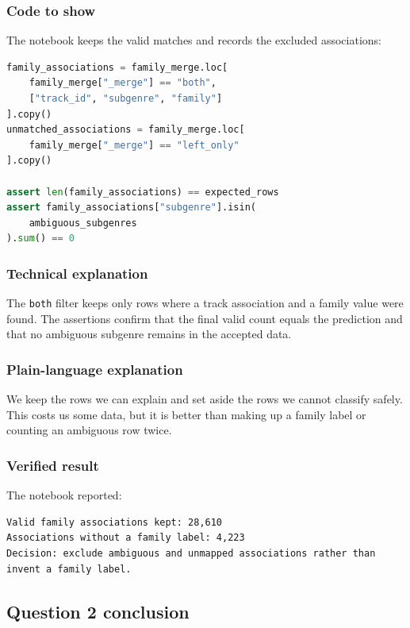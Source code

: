 \documentclass[11pt,a4paper]{article}
\begin{document}
\subsubsection*{Code to show}
The notebook keeps the valid matches and records the excluded associations:

\begin{lstlisting}[language=Python]
family_associations = family_merge.loc[
    family_merge["_merge"] == "both",
    ["track_id", "subgenre", "family"]
].copy()
unmatched_associations = family_merge.loc[
    family_merge["_merge"] == "left_only"
].copy()

assert len(family_associations) == expected_rows
assert family_associations["subgenre"].isin(
    ambiguous_subgenres
).sum() == 0
\end{lstlisting}

\subsubsection*{Technical explanation}
The \texttt{both} filter keeps only rows where a track association and a family value were found. The assertions confirm that the final valid count equals the prediction and that no ambiguous subgenre remains in the accepted data.

\subsubsection*{Plain-language explanation}
We keep the rows we can explain and set aside the rows we cannot classify safely. This costs us some data, but it is better than making up a family label or counting an ambiguous row twice.

\subsubsection*{Verified result}
The notebook reported:

\begin{lstlisting}
Valid family associations kept: 28,610
Associations without a family label: 4,223
Decision: exclude ambiguous and unmapped associations rather than invent a family label.
\end{lstlisting}

\subsection{Question 2 conclusion}
\end{document}
